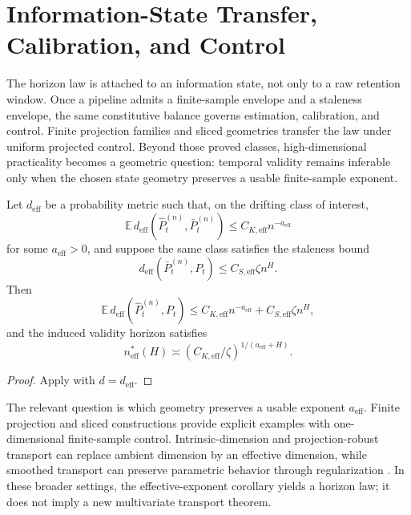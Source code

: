 \section{Information-State Transfer, Calibration, and Control}
\label{sec:transfer_operational_implications}

The horizon law is attached to an information state, not only to a raw
retention window. Once a pipeline admits a finite-sample envelope and a
staleness envelope, the same constitutive balance governs estimation,
calibration, and control. Finite projection families and sliced geometries
transfer the law under uniform projected control. Beyond those proved
classes, high-dimensional practicality becomes a geometric question: temporal
validity remains inferable only when the chosen state geometry preserves a
usable finite-sample exponent.

\begin{corollary}
\label{cor:effective_exponent_horizon_transfer}
Let $d_{\mathrm{eff}}$ be a probability metric such that, on the drifting class of
interest,
\[
  \mathbb E\,d_{\mathrm{eff}}\!\left(\widehat P_t^{(n)},\bar P_t^{(n)}\right)
  \le C_{K,\mathrm{eff}} n^{-a_{\mathrm{eff}}}
\]
for some $a_{\mathrm{eff}}>0$, and suppose the same class satisfies the staleness
bound
\[
  d_{\mathrm{eff}}\!\left(\bar P_t^{(n)},P_t\right)
  \le C_{S,\mathrm{eff}}\zeta n^H.
\]
Then
\[
  \mathbb E\,d_{\mathrm{eff}}\!\left(\widehat P_t^{(n)},P_t\right)
  \le C_{K,\mathrm{eff}} n^{-a_{\mathrm{eff}}} + C_{S,\mathrm{eff}}\zeta n^H,
\]
and the induced validity horizon satisfies
\[
  n^*_{\mathrm{eff}}(H)
  \asymp
  (C_{K,\mathrm{eff}}/\zeta)^{1/(a_{\mathrm{eff}}+H)}.
\]
\end{corollary}

\begin{proof}
Apply  with $d=d_{\mathrm{eff}}$.
\end{proof}

The relevant question is which geometry preserves a usable exponent
$a_{\mathrm{eff}}$. Finite projection and sliced constructions provide explicit
examples with one-dimensional finite-sample control. Intrinsic-dimension and
projection-robust transport can replace ambient dimension by an effective
dimension, while smoothed transport can preserve parametric behavior through
regularization \citep{NilesWeedBach2019,PatyCuturi2019,NietertEtAl2022}. In
these broader settings, the effective-exponent corollary yields a horizon law;
it does not imply a new multivariate transport theorem.

